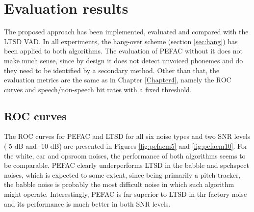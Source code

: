 
\section{Evaluation results}

The proposed approach has been implemented, evaluated and compared with the LTSD VAD. In all experiments, the hang-over scheme (section \ref{sec:hang}) has been applied to both algorithms. The evaluation of PEFAC without it does not make much sense, since by design it does not detect unvoiced phonemes and do they need to be identified by a secondary method. Other than that, the evaluation metrics are the same as in Chapter \ref{Chapter4}, namely the ROC curves and speech/non-speech hit rates with a fixed threshold.

\subsection{ROC curves}

The ROC curves for PEFAC and LTSD for all six noise types and two SNR levels (-5 dB and -10 dB) are presented in Figures \ref{fig:pefacm5} and \ref{fig:pefacm10}. For the white, car and opsroom noises, the performance of both algorithms seems to be comparable. PEFAC clearly underperforms LTSD in the babble and spchspect noises, which is expected to some extent, since being primarily a pitch tracker, the babble noise is probably the most difficult noise in which such algorithm might operate. Interestingly, PEFAC is far superior to LTSD in thr factory noise and its performance is much better in both SNR levels.

